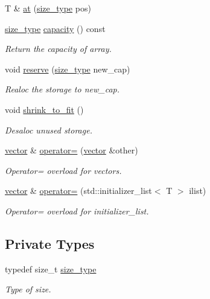 \begin{DoxyCompactItemize}
T \& \hyperlink{classsc_1_1vector_ab6fc47c9994c531ff8d0a0b46fe422f8}{at} (\hyperlink{classsc_1_1vector_aa4500ebad5be45f8d469fc4b5d62b19d}{size\+\_\+type} pos)
\item 
\hyperlink{classsc_1_1vector_aa4500ebad5be45f8d469fc4b5d62b19d}{size\+\_\+type} \hyperlink{classsc_1_1vector_a318c4ab34bd9605214e99db94c4258a9}{capacity} () const
\begin{DoxyCompactList}\small\item\em Return the capacity of array. \end{DoxyCompactList}\item 
void \hyperlink{classsc_1_1vector_adf9b78a735c50b4c4447ab8df5cab49e}{reserve} (\hyperlink{classsc_1_1vector_aa4500ebad5be45f8d469fc4b5d62b19d}{size\+\_\+type} new\+\_\+cap)
\begin{DoxyCompactList}\small\item\em Realoc the storage to new\+\_\+cap. \end{DoxyCompactList}\item 
void \hyperlink{classsc_1_1vector_aaeb01dacb26f39fb08cffc6f274284fd}{shrink\+\_\+to\+\_\+fit} ()
\begin{DoxyCompactList}\small\item\em Desaloc unused storage. \end{DoxyCompactList}\item 
\hyperlink{classsc_1_1vector}{vector} \& \hyperlink{classsc_1_1vector_ace673225b78ef6d02561b9e2777398c2}{operator=} (\hyperlink{classsc_1_1vector}{vector} \&other)
\begin{DoxyCompactList}\small\item\em Operator= overload for vectors. \end{DoxyCompactList}\item 
\hyperlink{classsc_1_1vector}{vector} \& \hyperlink{classsc_1_1vector_a757984cf36675541db735350d227d609}{operator=} (std\+::initializer\+\_\+list$<$ T $>$ ilist)
\begin{DoxyCompactList}\small\item\em Operator= overload for initializer\+\_\+list. \end{DoxyCompactList}\end{DoxyCompactItemize}
\subsection*{Private Types}
\begin{DoxyCompactItemize}
\item 
typedef size\+\_\+t \hyperlink{classsc_1_1vector_aa4500ebad5be45f8d469fc4b5d62b19d}{size\+\_\+type}
\begin{DoxyCompactList}\small\item\em Type of size. \end{DoxyCompactList}\end{DoxyCompactItemize}

